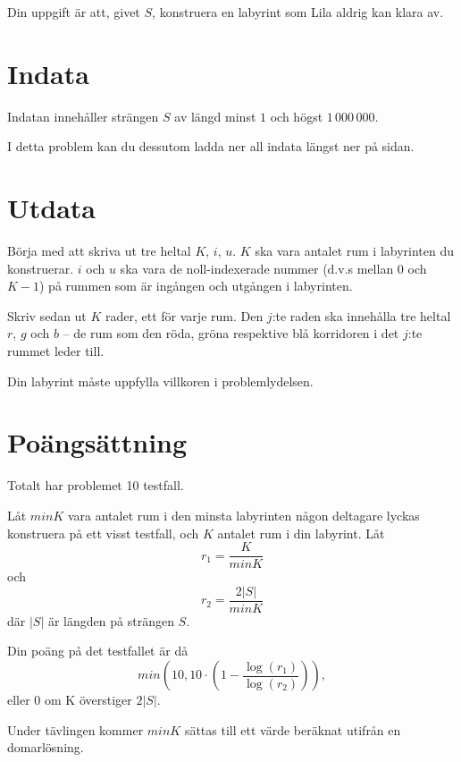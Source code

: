 Din uppgift är att, givet $S$, konstruera en labyrint som Lila aldrig kan klara av.

\section*{Indata}
Indatan innehåller strängen $S$ av längd minst $1$ och högst $1\,000\,000$.

I detta problem kan du dessutom ladda ner all indata längst ner på sidan.

\section*{Utdata}
Börja med att skriva ut tre heltal $K$, $i$, $u$.
$K$ ska vara antalet rum i labyrinten du konstruerar.
$i$ och $u$ ska vara de noll-indexerade nummer (d.v.s mellan $0$ och $K - 1$) på rummen som är ingången och utgången i labyrinten.

Skriv sedan ut $K$ rader, ett för varje rum.
Den $j$:te raden ska innehålla tre heltal $r$, $g$ och $b$ -- de rum som den röda, gröna respektive blå korridoren i det $j$:te rummet leder till.

Din labyrint måste uppfylla villkoren i problemlydelsen.

\section*{Poängsättning}
Totalt har problemet 10 testfall.

Låt $minK$ vara antalet rum i den minsta labyrinten någon deltagare lyckas konstruera på ett visst testfall, och $K$ antalet rum i din labyrint.
Låt
$$r_1 = \frac{K}{minK}$$
och
$$r_2 = \frac{2|S|}{minK}$$
där $|S|$ är längden på strängen $S$.

Din poäng på det testfallet är då
$$min(10, 10 \cdot \left(1 - \frac{\log(r_1)}{\log(r_2)}\right)),$$
eller 0 om K överstiger $2|S|$.

Under tävlingen kommer $minK$ sättas till ett värde beräknat utifrån en domarlösning.
